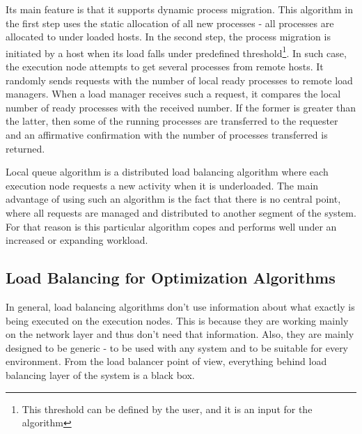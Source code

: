 Its main feature is that it supports dynamic process migration.
This algorithm in the first step uses the static allocation of all new processes - all processes are allocated to under loaded hosts.
In the second step, the process migration is initiated by a host when its load falls under predefined threshold\footnote{
This threshold can be defined by the user, and it is an input for the algorithm}.
In such case, the execution node attempts to get several processes from remote hosts.
It randomly sends requests with the number of local ready processes to remote load managers.
When a load manager receives such a request, it compares the local number of ready processes with the received number.
If the former is greater than the latter, then some of the running processes are transferred to the requester
and an affirmative confirmation with the number of processes transferred is returned.\cite{sharma2008performance}

Local queue algorithm is a distributed load balancing algorithm where each execution node requests a new activity when it is underloaded.
The main advantage of using such an algorithm is the fact that there is no central point,
where all requests are managed and distributed to another segment of the system.
For that reason is this particular algorithm copes and performs well under an increased or expanding workload.




\subsection{Load Balancing for Optimization Algorithms}\label{subsec:load-balancing-for-optimization-algorithms}
In general, load balancing algorithms don't use information about what exactly is being executed on the execution nodes.
This is because they are working mainly on the network layer and thus don't need that information.
Also, they are mainly designed to be generic - to be used with any system and to be suitable for every environment.
From the load balancer point of view, everything behind load balancing layer of the system is a black box.

